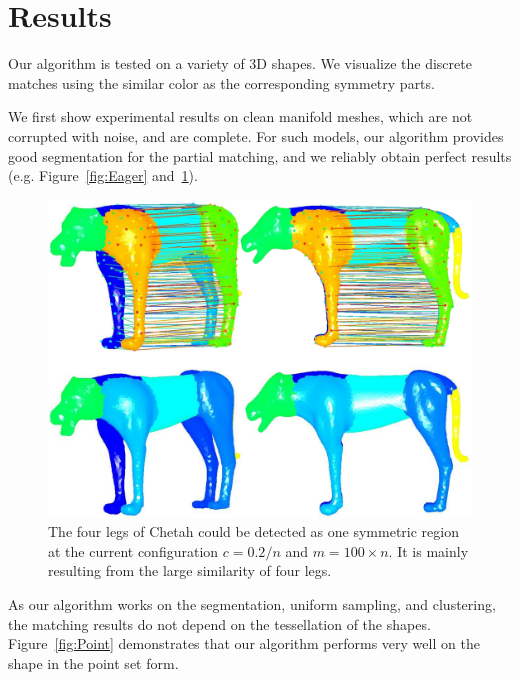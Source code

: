 \section{Results}
\label{sec:result}

Our algorithm is tested on a variety of 3D shapes. 
We visualize the discrete matches using the similar color as the corresponding symmetry parts.

We first show experimental results on clean manifold meshes, which are not corrupted with noise, and are complete. 
For such models, our algorithm provides good segmentation for the partial matching, and we reliably obtain perfect results (e.g. Figure~\ref{fig:Eager} and~\ref{fig:Tiger}). 

\begin{figure}[t]
\centering
  \includegraphics[width=0.99\linewidth]{figures/chetah.pdf}
  \caption{The four legs of Chetah could be detected as one symmetric region at the current configuration $c=0.2/n$ and $m=100 \times n$.
  It is mainly resulting from the large similarity of four legs.}
\label{fig:Tiger}
\end{figure}

As our algorithm works on the segmentation, uniform sampling, and clustering, the matching results do not depend on the tessellation of the shapes.
Figure~\ref{fig:Point} demonstrates that our algorithm performs very well on the shape in the point set form.

